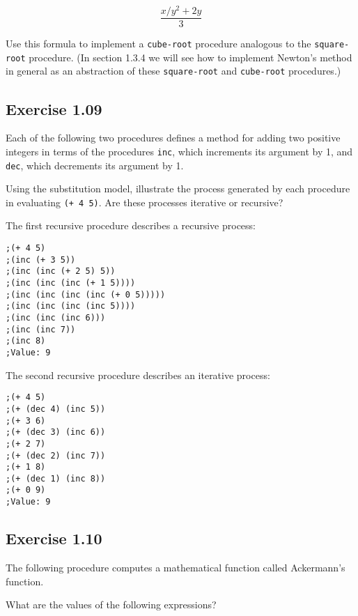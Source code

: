 \documentclass[letterpaper, leqno]{article}
\begin{document}
$$\frac{x/y^2 + 2y}{3}$$

Use this formula to implement a \texttt{cube-root} procedure analogous to the \texttt{square-root} procedure. (In section 1.3.4 we will see how to implement Newton's method in general as an abstraction of these \texttt{square-root} and \texttt{cube-root} procedures.) 



\subsection*{Exercise 1.09}
Each of the following two procedures defines a method for adding two positive integers in terms of the procedures \texttt{inc}, which increments its argument by 1, and \texttt{dec}, which decrements its argument by 1.



Using the substitution model, illustrate the process generated by each procedure in evaluating \texttt{(+ 4 5)}. Are these processes iterative or recursive?

\bigskip

\textcolor{answer}{
  The first recursive procedure describes a recursive process:
}

{\color{answer}
\begin{verbatim}
;(+ 4 5)
;(inc (+ 3 5))
;(inc (inc (+ 2 5) 5))
;(inc (inc (inc (+ 1 5))))
;(inc (inc (inc (inc (+ 0 5)))))
;(inc (inc (inc (inc 5))))
;(inc (inc (inc 6)))
;(inc (inc 7))
;(inc 8)
;Value: 9
\end{verbatim}
}

\textcolor{answer}{
  The second recursive procedure describes an iterative process:
}

{\color{answer}
\begin{verbatim}
;(+ 4 5)
;(+ (dec 4) (inc 5))
;(+ 3 6)
;(+ (dec 3) (inc 6))
;(+ 2 7)
;(+ (dec 2) (inc 7))
;(+ 1 8)
;(+ (dec 1) (inc 8))
;(+ 0 9)
;Value: 9
\end{verbatim}
}

\subsection*{Exercise 1.10}
The following procedure computes a mathematical function called Ackermann's function.



What are the values of the following expressions?
\end{document}
